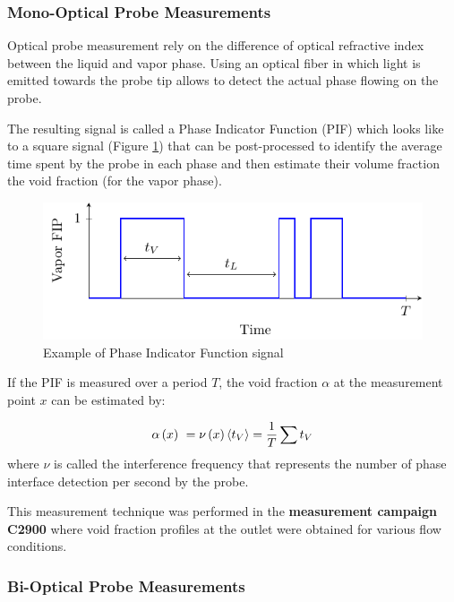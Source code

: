 \subsubsection{Mono-Optical Probe Measurements}


Optical probe measurement rely on the difference of optical refractive index between the liquid and vapor phase. Using an optical fiber in which light is emitted towards the probe tip allows to detect the actual phase flowing on the probe. 

\npar

The resulting signal is called a Phase Indicator Function (PIF) which looks like to a square signal (Figure \ref{fig:FIP}) that can be post-processed to identify the average time spent by the probe in each phase and then estimate their volume fraction \eg the void fraction (for the vapor phase). 


\begin{figure}[!h]
\centering
\includegraphics[width=0.65\linewidth]{img/DEBORA/FIP.pdf}
\caption{Example of Phase Indicator Function signal}
\label{fig:FIP}
\end{figure}



If the PIF is measured over a period $T$, the void fraction $\alpha$ at the measurement point $x$ can be estimated by:


\begin{equation}
\alpha\left( x \right)\ = \nu\left( x \right) \left<{t_{V}}\right> = \frac{1}{T} \sum t_{V}
\end{equation}
where $\nu$ is called the interference frequency that represents the number of phase interface detection per second by the probe.

\begin{note*}{}
This measurement technique was performed in the \textbf{measurement campaign C2900} where void fraction profiles at the outlet were obtained for various flow conditions.
\end{note*}

\subsubsection{Bi-Optical Probe Measurements}


